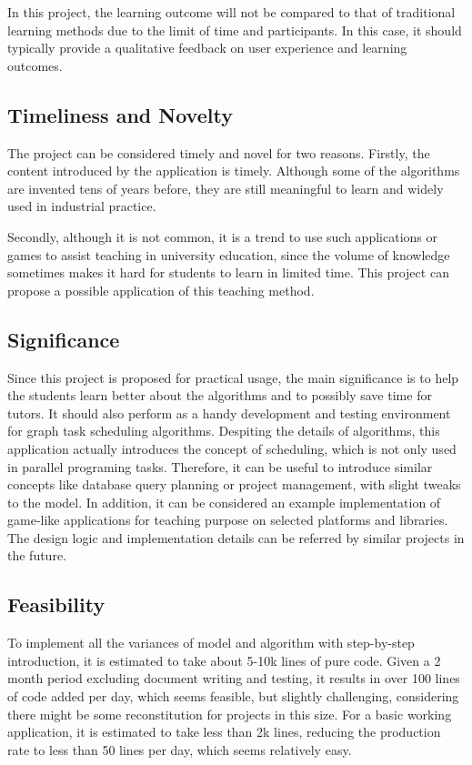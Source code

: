 \documentclass[a4paper,11pt]{article}
\begin{document}
In this project, the learning outcome will not be compared to that of traditional learning methods due to the limit of time and participants. In this case, it should typically provide a qualitative feedback on user experience and learning outcomes.

\subsection{Timeliness and Novelty}

The project can be considered timely and novel for two reasons. Firstly, the content introduced by the application is timely. Although some of the algorithms are invented tens of years before, they are still meaningful to learn and widely used in industrial practice.

Secondly, although it is not common, it is a trend to use such applications or games to assist teaching in university education, since the volume of knowledge sometimes makes it hard for students to learn in limited time. This project can propose a possible application of this teaching method.

\subsection{Significance} \label{sec:sig}

Since this project is proposed for practical usage, the main significance is to help the students learn better about the algorithms and to possibly save time for tutors. It should also perform as a handy development and testing environment for graph task scheduling algorithms. Despiting the details of algorithms, this application actually introduces the concept of scheduling, which is not only used in parallel programing tasks. Therefore, it can be useful to introduce similar concepts like database query planning or project management, with slight tweaks to the model. In addition, it can be considered an example implementation of game-like applications for teaching purpose on selected platforms and libraries. The design logic and implementation details can be referred by similar projects in the future.

\subsection{Feasibility}

To implement all the variances of model and algorithm with step-by-step introduction, it is estimated to take about 5-10k lines of pure code. Given a 2 month period excluding document writing and testing, it results in over 100 lines of code added per day, which seems feasible, but slightly challenging, considering there might be some reconstitution for projects in this size. For a basic working application, it is estimated to take less than 2k lines, reducing the production rate to less than 50 lines per day, which seems relatively easy.
\end{document}
